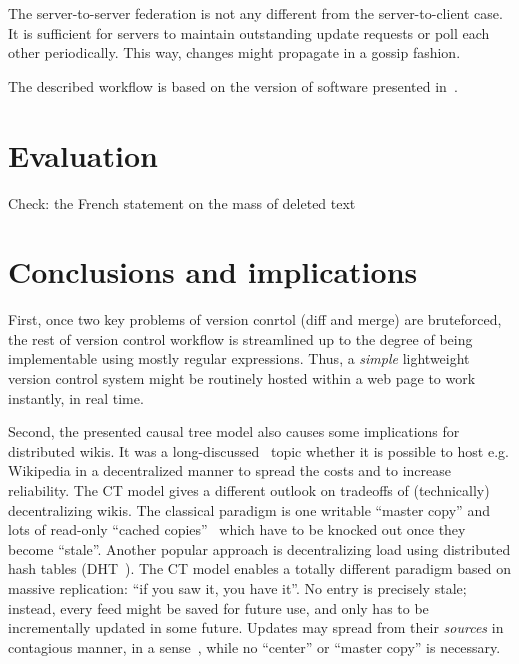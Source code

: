 \documentclass[twocolumn]{article}
\begin{document}
The server-to-server federation is not any different from the server-to-client case. It is sufficient for servers to maintain outstanding update requests or poll each other periodically. This way, changes might propagate in a gossip fashion.

The described workflow is based on the version of software presented in~\cite{broth-csr}.

\section{Evaluation}

Check: the French statement on the mass of deleted text

\section{Conclusions and implications}

First, once two key problems of version conrtol (diff and merge) are bruteforced, the rest of version control workflow is streamlined up to the degree of being implementable using mostly regular expressions. Thus, a \emph{simple} lightweight version control system might be routinely hosted within a web page to work instantly, in real time.

Second, the presented causal tree model also causes some implications for distributed wikis. It was a long-discussed~\cite{dht-wiki,piki} topic whether it is possible to host e.g. Wikipedia in a decentralized manner to spread the costs and to increase reliability. The CT model gives a different outlook on tradeoffs of (technically) decentralizing wikis. The classical paradigm is one writable ``master copy'' and lots of read-only ``cached copies''~\cite{steen-wiki} which have to be knocked out once they become ``stale''. Another popular approach is decentralizing load using distributed hash tables (DHT~\cite{dht-wiki}). The CT model enables a totally different paradigm based on massive replication: ``if you saw it, you have it''. No entry is precisely stale; instead, every feed might be saved for future use, and only has to be incrementally updated in some future. Updates may spread from their \emph{sources} in contagious manner, in a sense~\cite{contagious}, while no ``center'' or ``master copy'' is necessary.
\end{document}
